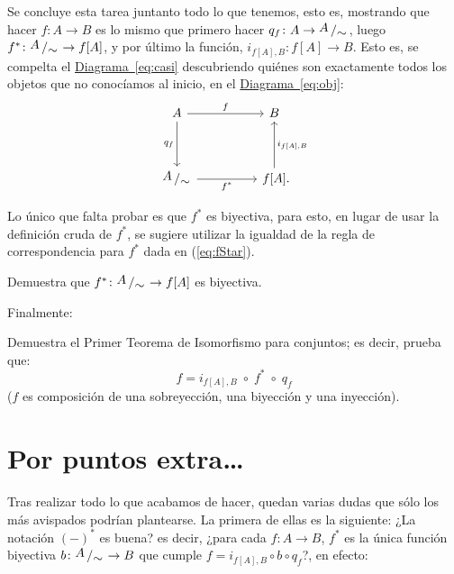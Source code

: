 \documentclass[letterpaper,DIV=14,headsepline,12pt]{scrartcl}
\newcommand{\pts}{}
\newenvironment{ejercicio}[1]{\ifthenelse{\equal{#1}{1} \OR
\equal{#1}{+1}}{\renewcommand{\pts}{\textbf{(#1
pt)}}}{\renewcommand{\pts}{\textbf{(#1 pts)}}}\begin{ejj}\upshape
\pts}{\end{ejj}}
\newcommand{\quot}[2]{{\raisebox{.2em}{$#1$}\left/\raisebox{-.2em}{$#2$}\right.}}
\begin{document}
    Se concluye esta tarea juntanto todo lo que tenemos, esto es, mostrando que
    hacer $f\colon A\to B$ es lo mismo que primero hacer $q_f\colon A\to \quot{A}{\sim}$,
    luego $f^*\colon \quot{A}{\sim} \to f[A]$, y por último la función, $i_{f[A],B}:f[A] \to B$. Esto es,
    se compelta el \hyperref[eq:obj]{Diagrama~\ref*{eq:casi}} descubriendo
    quiénes son exactamente todos los objetos que no conocíamos al inicio, en
    el \hyperref[eq:obj]{Diagrama~\ref*{eq:obj}}:
    \begin{equation}\label{eq:ya}
        \begin{tikzcd}
            A && B \\
            \\
            \quot{A}{\sim} && {f[A]}\mathrlap{.}
            \arrow["f", from=1-1, to=1-3]
            \arrow["q_f"', from=1-1, to=3-1]
            \arrow["f^*"', from=3-1, to=3-3]
            \arrow["{i_{f[A],B}}"', from=3-3, to=1-3]
        \end{tikzcd}
    \end{equation}

    Lo único que falta probar es que $f^*$ es biyectiva, para esto, en lugar de
    usar la definición cruda de $f^*$, se sugiere utilizar la igualdad de la
    regla de correspondencia para $f^*$ dada en (\ref{eq:fStar}).

    \begin{ejercicio}{1}
        Demuestra que $f^*\colon \quot{A}{\sim} \to f[A]$ es biyectiva.
    \end{ejercicio}

    Finalmente:
    \begin{ejercicio}{.5}
        Demuestra el Primer Teorema de Isomorfismo para conjuntos; es decir,
        prueba que:
        \[ f=i_{f[A],B} \; \circ \; f^* \; \circ \; q_f \] ($f$ es composición
        de una sobreyección, una biyección y una inyección).
    \end{ejercicio}

    \section*{Por puntos extra\dots}

    Tras realizar todo lo que acabamos de hacer, quedan varias dudas que sólo
    los más avispados podrían plantearse. La primera de ellas es la siguiente:
    ¿La notación $(-)^*$ es buena? es decir, ¿para cada $f\colon A \to B$, $f^*$ es la
    única función biyectiva $b\colon \quot{A}{\sim}\to B$ que cumple 
    $f=i_{f[A],B} \circ b \circ q_f$?, en efecto:
\end{document}
